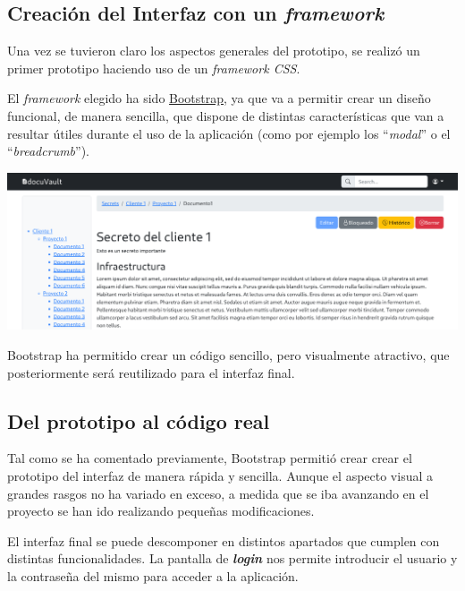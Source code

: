 \documentclass{\ClassPath/viu-tfm-template}
\begin{document}
\subsection{Creación del Interfaz con un \textit{framework}}
Una vez se tuvieron claro los aspectos generales del prototipo, se realizó un primer prototipo haciendo uso de un \textit{framework CSS}.

El \textit{framework} elegido ha sido \href{https://getbootstrap.com/}{Bootstrap}, ya que va a permitir crear un diseño funcional, de manera sencilla, que dispone de distintas características que  van a resultar útiles durante el uso de la aplicación (como por ejemplo los “\textit{modal}” o el “\textit{breadcrumb}”).

\begin{center}
    \includegraphics[frame,width=\linewidth]{img/boceto2.png}
    \vspace{-20pt}
\end{center}

Bootstrap ha permitido crear un código sencillo, pero visualmente atractivo, que posteriormente será reutilizado para el interfaz final.


\subsection{Del prototipo al código real}

Tal como se ha comentado previamente, Bootstrap permitió crear crear el prototipo del interfaz de manera rápida y sencilla. Aunque el aspecto visual a grandes rasgos no ha variado en exceso, a medida que se iba avanzando en el proyecto se han ido realizando pequeñas modificaciones.

El interfaz final se puede descomponer en distintos apartados que cumplen con distintas funcionalidades. La pantalla de \textit{\textbf{login}} nos permite introducir el usuario y la contraseña del mismo para acceder a la aplicación.
\end{document}
